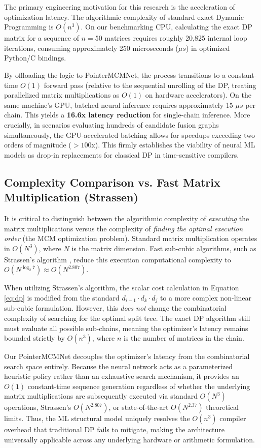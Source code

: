 \documentclass[conference]{IEEEtran}
\begin{document}
The primary engineering motivation for this research is the acceleration of optimization latency. The algorithmic complexity of standard exact Dynamic Programming is $O(n^3)$. On our benchmarking CPU, calculating the exact DP matrix for a sequence of $n=50$ matrices requires roughly 20,825 internal loop iterations, consuming approximately 250 microseconds ($\mu s$) in optimized Python/C bindings. 

By offloading the logic to PointerMCMNet, the process transitions to a constant-time $O(1)$ forward pass (relative to the sequential unrolling of the DP, treating parallelized matrix multiplications as $O(1)$ on hardware accelerators). On the same machine's GPU, batched neural inference requires approximately 15 $\mu s$ per chain. This yields a \textbf{16.6x latency reduction} for single-chain inference. More crucially, in scenarios evaluating hundreds of candidate fusion graphs simultaneously, the GPU-accelerated batching allows for speedups exceeding two orders of magnitude ($>100$x). This firmly establishes the viability of neural ML models as drop-in replacements for classical DP in time-sensitive compilers.

\subsection{Complexity Comparison vs. Fast Matrix Multiplication (Strassen)}
It is critical to distinguish between the algorithmic complexity of \textit{executing} the matrix multiplications versus the complexity of \textit{finding the optimal execution order} (the MCM optimization problem). Standard matrix multiplication operates in $O(N^3)$, where $N$ is the matrix dimension. Fast sub-cubic algorithms, such as Strassen's algorithm \cite{b5}, reduce this execution computational complexity to $O(N^{\log_2 7}) \approx O(N^{2.807})$. 

When utilizing Strassen's algorithm, the scalar cost calculation in Equation \eqref{eq:dp} is modified from the standard $d_{i-1} \cdot d_k \cdot d_j$ to a more complex non-linear sub-cubic formulation. However, this \textit{does not} change the combinatorial complexity of searching for the optimal split tree. The exact DP algorithm still must evaluate all possible sub-chains, meaning the optimizer's latency remains bounded strictly by $O(n^3)$, where $n$ is the number of matrices in the chain. 

Our PointerMCMNet decouples the optimizer's latency from the combinatorial search space entirely. Because the neural network acts as a parameterized heuristic policy rather than an exhaustive search mechanism, it provides an $O(1)$ constant-time sequence generation regardless of whether the underlying matrix multiplications are subsequently executed via standard $O(N^3)$ operations, Strassen's $O(N^{2.807})$, or state-of-the-art $O(N^{2.37})$ theoretical limits. Thus, the ML structural model uniquely resolves the $O(n^3)$ compiler overhead that traditional DP fails to mitigate, making the architecture universally applicable across any underlying hardware or arithmetic formulation.
\end{document}
